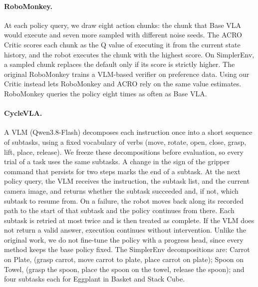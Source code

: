 \paragraph{RoboMonkey.}
At each policy query, we draw eight action chunks: the chunk that Base VLA would execute and seven more sampled with different noise seeds. The ACRO Critic scores each chunk as the Q value of executing it from the current state history, and the robot executes the chunk with the highest score. On SimplerEnv, a sampled chunk replaces the default only if its score is strictly higher. The original RoboMonkey trains a VLM-based verifier on preference data. Using our Critic instead lets RoboMonkey and ACRO rely on the same value estimates. RoboMonkey queries the policy eight times as often as Base VLA.

\paragraph{CycleVLA.}
A VLM (Qwen3.8-Flash) decomposes each instruction once into a short sequence of subtasks, using a fixed vocabulary of verbs (move, rotate, open, close, grasp, lift, place, release). We freeze these decompositions before evaluation, so every trial of a task uses the same subtasks. A change in the sign of the gripper command that persists for two steps marks the end of a subtask. At the next policy query, the VLM receives the instruction, the subtask list, and the current camera image, and returns whether the subtask succeeded and, if not, which subtask to resume from. On a failure, the robot moves back along its recorded path to the start of that subtask and the policy continues from there. Each subtask is retried at most twice and is then treated as complete. If the VLM does not return a valid answer, execution continues without intervention. Unlike the original work, we do not fine-tune the policy with a progress head, since every method keeps the base policy fixed. The SimplerEnv decompositions are: Carrot on Plate, (grasp carrot, move carrot to plate, place carrot on plate); Spoon on Towel, (grasp the spoon, place the spoon on the towel, release the spoon); and four subtasks each for Eggplant in Basket and Stack Cube.

